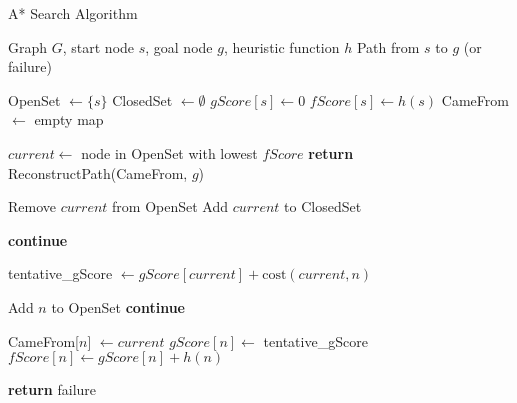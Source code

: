 \begin{algorithm}
\caption{A* Search Algorithm}
\label{alg:AStar}
\begin{algorithmic}[1]
\REQUIRE Graph $G$, start node $s$, goal node $g$, heuristic function $h$
\ENSURE Path from $s$ to $g$ (or failure)

\STATE OpenSet $\gets \{s\}$
\STATE ClosedSet $\gets \emptyset$
\STATE $gScore[s] \gets 0$
\STATE $fScore[s] \gets h(s)$
\STATE CameFrom $\gets$ empty map

    \STATE $current \gets$ node in OpenSet with lowest $fScore$
        \STATE \textbf{return} ReconstructPath(CameFrom, $g$)
    \ENDIF

    \STATE Remove $current$ from OpenSet
    \STATE Add $current$ to ClosedSet

            \STATE \textbf{continue}
        \ENDIF
        
        \STATE tentative\_gScore $\gets gScore[current] + \text{cost}(current, n)$
        
            \STATE Add $n$ to OpenSet
            \STATE \textbf{continue}
        \ENDIF
        
        \STATE CameFrom[$n$] $\gets current$
        \STATE $gScore[n] \gets$ tentative\_gScore
        \STATE $fScore[n] \gets gScore[n] + h(n)$
    \ENDFOR
\ENDWHILE

\STATE \textbf{return} failure

\end{algorithmic}
\end{algorithm}